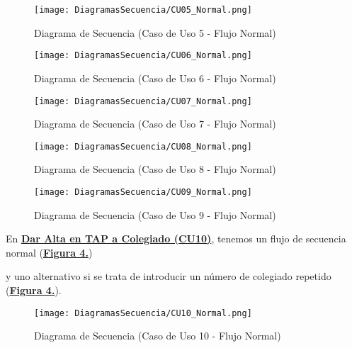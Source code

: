 \begin{figure}[!htbp]
  \centering
  \texttt{[image: DiagramasSecuencia/CU05\_Normal.png]}
  \caption{Diagrama de Secuencia (Caso de Uso 5 - Flujo Normal)}
  \label{fig:Secuencia_CU5_Normal}
\end{figure}
\FloatBarrier

\begin{figure}[!htbp]
  \centering
  \texttt{[image: DiagramasSecuencia/CU06\_Normal.png]}
  \caption{Diagrama de Secuencia (Caso de Uso 6 - Flujo Normal)}
  \label{fig:Secuencia_CU6_Normal}
\end{figure}
\FloatBarrier

\begin{figure}[!htbp]
  \centering
  \texttt{[image: DiagramasSecuencia/CU07\_Normal.png]}
  \caption{Diagrama de Secuencia (Caso de Uso 7 - Flujo Normal)}
  \label{fig:Secuencia_CU7_Normal}
\end{figure}
\FloatBarrier

\begin{figure}[!htbp]
  \centering
  \texttt{[image: DiagramasSecuencia/CU08\_Normal.png]}
  \caption{Diagrama de Secuencia (Caso de Uso 8 - Flujo Normal)}
  \label{fig:Secuencia_CU8_Normal}
\end{figure}
\FloatBarrier

\begin{figure}[!htbp]
  \centering
  \texttt{[image: DiagramasSecuencia/CU09\_Normal.png]}
  \caption{Diagrama de Secuencia (Caso de Uso 9 - Flujo Normal)}
  \label{fig:Secuencia_CU9_Normal}
\end{figure}
\FloatBarrier

\addtocounter{figura_cap4}{1}
En \textbf{\hyperref[tab:curColegAlta]{Dar Alta en TAP a Colegiado (CU10)}}, tenemos un flujo de secuencia normal (\textbf{\hyperref[fig:Secuencia_CU10_Normal]{Figura 4.}}) \addtocounter{figura_cap4}{1} y uno alternativo si se trata de introducir un número de colegiado repetido (\textbf{\hyperref[fig:Secuencia_CU10_Alt1]{Figura 4.}}).
\begin{landscape}
  \label{fig:Secuencia_CU10_Normal}
  \vspace*{\fill}
  \begin{figure}[!htbp]
    \centering
    \texttt{[image: DiagramasSecuencia/CU10\_Normal.png]}
    \caption{Diagrama de Secuencia (Caso de Uso 10 - Flujo Normal)}
  \end{figure}
  \vfill
\end{landscape}
\FloatBarrier

